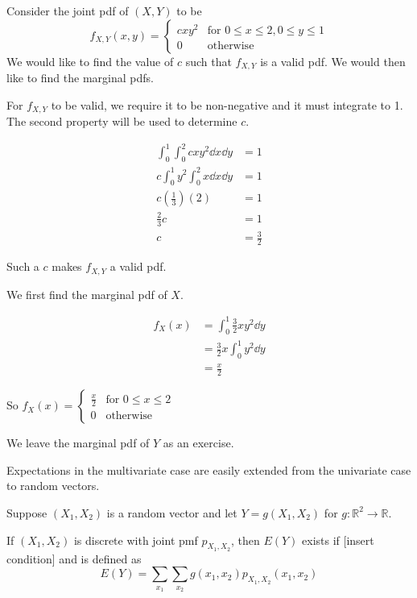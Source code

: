 \begin{example}[]
	Consider the joint pdf of $(X,Y)$ to be
	$$f_{X,Y}(x,y)=\begin{cases}
		cxy^2 & \text{for $0\leq x\leq 2,0\leq y\leq 1$}\\
		0 & \text{otherwise}
	\end{cases}$$
	We would like to find the value of $c$ such that $f_{X,Y}$ is a valid pdf. We would then like to find the marginal pdfs.

	For $f_{X,Y}$ to be valid, we require it to be non-negative and it must integrate to 1. The second property will be used to determine $c$.

	\begin{align*}
		\int_0^1\int_0^2 cxy^2\dd x\dd y & =1\\
		c\int_0^1y^2\int_0^2 x\dd x\dd y & =1\\
		c\left(\frac 13\right)(2)&=1\\
		\frac 23 c&=1\\
		c&=\frac 32
	\end{align*}

	Such a $c$ makes $f_{X,Y}$ a valid pdf.

	We first find the marginal pdf of $X$.

	\begin{align*}
		f_X(x)&=\int_0^1\frac 32xy^2\dd y\\
		&=\frac 32x\int_0^1y^2\dd y\\
		&=\frac x2
	\end{align*}

	So $f_X(x)=\begin{cases}
		\frac x 2 & \text{for $0\leq x\leq 2$}\\
		0 & \text{otherwise}
	\end{cases}$

	We leave the marginal pdf of $Y$ as an exercise.
\end{example}

Expectations in the multivariate case are easily extended from the univariate case to random vectors.

Suppose $(X_1,X_2)$ is a random vector and let $Y=g(X_1,X_2)$ for $g:\mathbb R^2\to\mathbb R$.

If $(X_1,X_2)$ is discrete with joint pmf $p_{X_1,X_2}$, then $E(Y)$ exists if [insert condition] and is defined as $$E(Y)=\sum_{x_1}\sum_{x_2} g(x_1,x_2)p_{X_1,X_2}(x_1,x_2)$$
